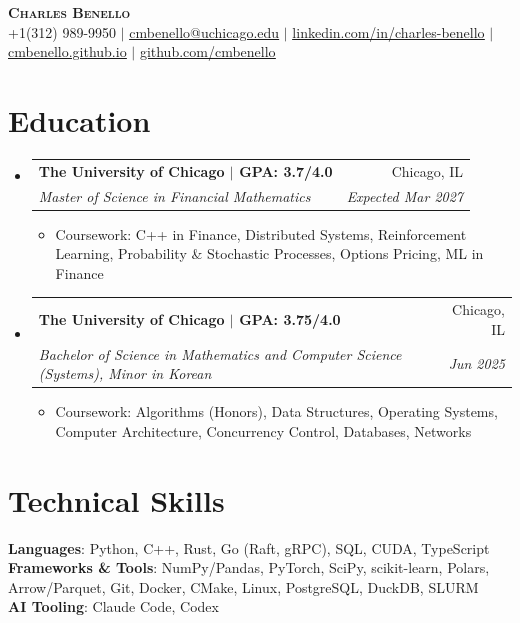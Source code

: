 \documentclass[letterpaper,10pt]{article}
\makeatletter
\newcommand{\resumeItem}[1]{
  \item\small{
    {#1 \vspace{-3pt}}
  }
}
\newcommand{\resumeSubheading}[4]{
  \item
    \begin{tabular*}{0.99\textwidth}[t]{l@{\extracolsep{\fill}}r}
      \textbf{#1} & #2 \\
      \textit{\small#3} & \textit{\small #4} \\
    \end{tabular*}\vspace{-8pt}
}
\newcommand{\resumeSubHeadingListStart}{\begin{itemize}[leftmargin=0.015in, label={}]}
\newcommand{\resumeSubHeadingListEnd}{\end{itemize}}
\newcommand{\resumeItemListStart}{\begin{itemize}[leftmargin=0.15in]}
\newcommand{\resumeItemListEnd}{\end{itemize}\vspace{-7pt}}
\makeatother
\begin{document}
\begin{center}
    \textbf{\Huge \scshape Charles Benello} \\ \vspace{1pt}
    \small +1(312) 989-9950 $|$ \href{mailto:cmbenello@uchicago.edu}{\underline{cmbenello@uchicago.edu}} $|$
    \href{https://linkedin.com/in/charles-benello/}{\underline{linkedin.com/in/charles-benello}} $|$
    \href{https://cmbenello.github.io}{\underline{cmbenello.github.io}} $|$
    \href{https://github.com/cmbenello}{\underline{github.com/cmbenello}}
\end{center}

\section{Education}
  \resumeSubHeadingListStart
    \resumeSubheading
      {The University of Chicago \textbf{$|$ GPA: 3.7/4.0}}{Chicago, IL}
      {Master of Science in Financial Mathematics}{Expected Mar 2027}
      \resumeItemListStart
        \resumeItem{Coursework: C++ in Finance, Distributed Systems, Reinforcement Learning, Probability \& Stochastic Processes, Options Pricing, ML in Finance}
      \resumeItemListEnd
    \resumeSubheading
      {The University of Chicago \textbf{$|$ GPA: 3.75/4.0}}{Chicago, IL}
      {Bachelor of Science in Mathematics and Computer Science (Systems), Minor in Korean}{Jun 2025}
      \resumeItemListStart
        \resumeItem{Coursework: Algorithms (Honors), Data Structures, Operating Systems, Computer Architecture, Concurrency Control, Databases, Networks}
      \resumeItemListEnd
  \resumeSubHeadingListEnd

\section{Technical Skills}
 \begin{itemize}[leftmargin=0.015in, label={}]
    \small{\item{
     \textbf{Languages}{: Python, C++, Rust, Go (Raft, gRPC), SQL, CUDA, TypeScript} \\
     \textbf{Frameworks \& Tools}{: NumPy/Pandas, PyTorch, SciPy, scikit-learn, Polars, Arrow/Parquet, Git, Docker, CMake, Linux, PostgreSQL, DuckDB, SLURM} \\
     \textbf{AI Tooling}{: Claude Code, Codex}
    }}
 \end{itemize}\vspace{-9pt}
\end{document}
